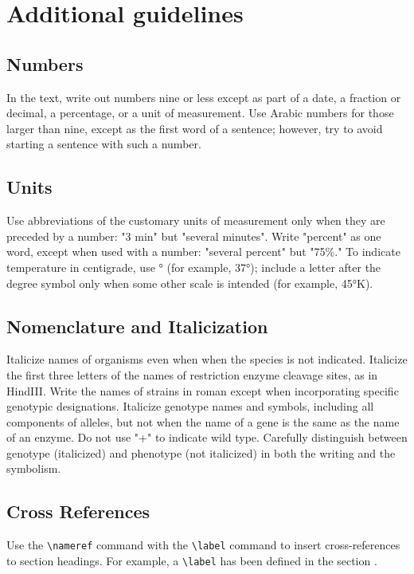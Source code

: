 \documentclass[9pt,twocolumn,twoside,lineno]{gsajnl}
\begin{document}
\section{Additional guidelines}

\subsection{Numbers} In the text, write out numbers nine or less except as part of a date, a fraction or decimal, a percentage, or a unit of measurement. Use Arabic numbers for those larger than nine, except as the first word of a sentence; however, try to avoid starting a sentence with such a number.

\subsection{Units} Use abbreviations of the customary units of measurement only when they are preceded by a number: "3 min" but "several minutes". Write "percent" as one word, except when used with a number: "several percent" but "75\%." To indicate temperature in centigrade, use ° (for example, 37°); include a letter after the degree symbol only when some other scale is intended (for example, 45°K).

\subsection{Nomenclature and Italicization} Italicize names of organisms even when  when the species is not indicated.  Italicize the first three letters of the names of restriction enzyme cleavage sites, as in HindIII. Write the names of strains in roman except when incorporating specific genotypic designations. Italicize genotype names and symbols, including all components of alleles, but not when the name of a gene is the same as the name of an enzyme. Do not use "+" to indicate wild type. Carefully distinguish between genotype (italicized) and phenotype (not italicized) in both the writing and the symbolism.

\subsection{Cross References}
Use the \verb|\nameref| command with the \verb|\label| command to insert cross-references to section headings. For example, a \verb|\label| has been defined in the section .
\end{document}
